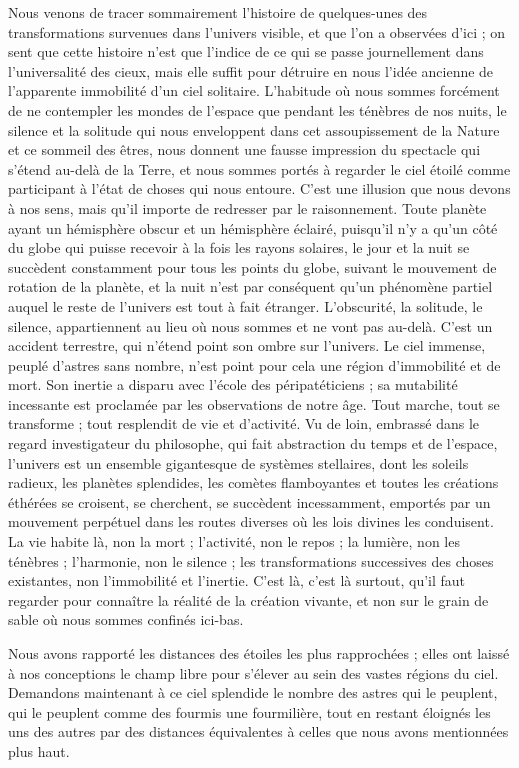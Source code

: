 \documentclass[a4paper, 11pt, oneside, landscape]{article}
\begin{document}
Nous venons de tracer sommairement l'histoire de quelques-unes des transformations survenues dans l'univers visible, et que l'on a observées d'ici ; on sent que cette histoire n'est que l'indice de ce qui se passe journellement dans l'universalité des cieux, mais elle suffit pour détruire en nous l'idée ancienne de l'apparente immobilité d'un ciel solitaire. L'habitude où nous sommes forcément de ne contempler les mondes de l'espace que pendant les ténèbres de nos nuits, le silence et la solitude qui nous enveloppent dans cet assoupissement de la Nature et ce sommeil des êtres, nous donnent une fausse impression du spectacle qui s'étend au-delà de la Terre, et nous sommes portés à regarder le ciel étoilé comme participant à l'état de choses qui nous entoure. C'est une illusion que nous devons à nos sens, mais qu'il importe de redresser par le raisonnement. Toute planète ayant un hémisphère obscur et un hémisphère éclairé, puisqu'il n'y a qu'un côté du globe qui puisse recevoir à la fois les rayons solaires, le jour et la nuit se succèdent constamment pour tous les points du globe, suivant le mouvement de rotation de la planète, et la nuit n'est par conséquent qu'un phénomène partiel auquel le reste de l'univers est tout à fait étranger. L'obscurité, la solitude, le silence, appartiennent au lieu où nous sommes et ne vont pas au-delà. C'est un accident terrestre, qui n'étend point son ombre sur l'univers. Le ciel immense, peuplé d'astres sans nombre, n'est point pour cela une région d'immobilité et de mort. Son inertie a disparu avec l'école des péripatéticiens ; sa mutabilité incessante est proclamée par les observations de notre âge. Tout marche, tout se transforme ; tout resplendit de vie et d'activité. Vu de loin, embrassé dans le regard investigateur du philosophe, qui fait abstraction du temps et de l'espace, l'univers est un ensemble gigantesque de systèmes stellaires, dont les soleils radieux, les planètes splendides, les comètes flamboyantes et toutes les créations éthérées se croisent, se cherchent, se succèdent incessamment, emportés par un mouvement perpétuel dans les routes diverses où les lois divines les conduisent. La vie habite là, non la mort ; l'activité, non le repos ; la lumière, non les ténèbres ; l'harmonie, non le silence ; les transformations successives des choses existantes, non l'immobilité et l'inertie. C'est là, c'est là surtout, qu'il faut regarder pour connaître la réalité de la création vivante, et non sur le grain de sable où nous sommes confinés ici-bas.

Nous avons rapporté les distances des étoiles les plus rapprochées ; elles ont laissé à nos conceptions le champ libre pour s'élever au sein des vastes régions du ciel. Demandons maintenant à ce ciel splendide le nombre des astres qui le peuplent, qui le peuplent comme des fourmis une fourmilière, tout en restant éloignés les uns des autres par des distances équivalentes à celles que nous avons mentionnées plus haut.
\end{document}
